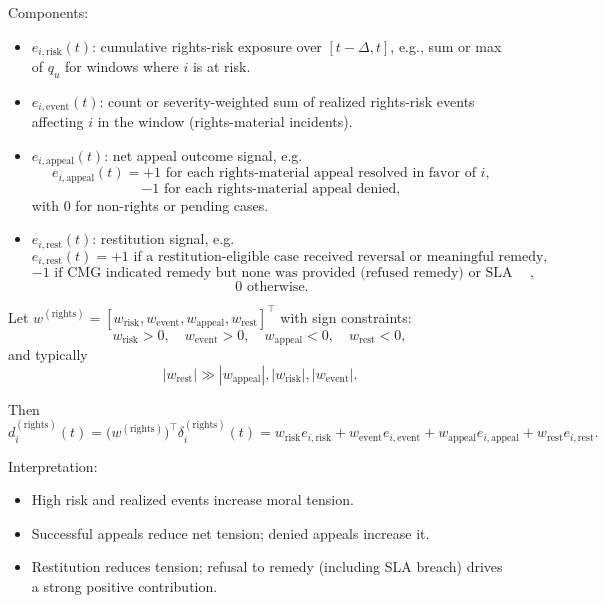 \documentclass[11pt]{article}
\begin{document}
Components:

\begin{itemize}[leftmargin=*]
  \item \(e_{i,\text{risk}}(t)\): cumulative rights-risk exposure over \([t-\Delta, t]\), e.g., sum or max of \(q_u\) for windows where \(i\) is at risk.

  \item \(e_{i,\text{event}}(t)\): count or severity-weighted sum of realized rights-risk events affecting \(i\) in the window (rights-material incidents).

  \item \(e_{i,\text{appeal}}(t)\): net appeal outcome signal, e.g.
  \[
  e_{i,\text{appeal}}(t) =
  +1 \text{ for each rights-material appeal resolved in favor of } i,
  \]
  \[
  -1 \text{ for each rights-material appeal denied},
  \]
  with 0 for non-rights or pending cases.

  \item \(e_{i,\text{rest}}(t)\): restitution signal, e.g.
  \[
  e_{i,\text{rest}}(t) =
  +1 \text{ if a restitution-eligible case received reversal or meaningful remedy},
  \]
  \[
  -1 \text{ if CMG indicated remedy but none was provided (refused remedy) or SLA was breached},
  \]
  \[
  0 \text{ otherwise}.
  \]
\end{itemize}

Let \(w^{(\text{rights})} = [w_{\text{risk}}, w_{\text{event}}, w_{\text{appeal}}, w_{\text{rest}}]^\top\) with sign constraints:
\[
w_{\text{risk}} > 0,\quad w_{\text{event}} > 0,\quad
w_{\text{appeal}} < 0,\quad w_{\text{rest}} < 0,
\]
and typically
\[
|w_{\text{rest}}| \gg |w_{\text{appeal}}|, |w_{\text{risk}}|, |w_{\text{event}}|.
\]

Then
\[
d_i^{(\text{rights})}(t) = \big(w^{(\text{rights})}\big)^\top \delta_i^{(\text{rights})}(t)
= w_{\text{risk}} e_{i,\text{risk}} + w_{\text{event}} e_{i,\text{event}} + w_{\text{appeal}} e_{i,\text{appeal}} + w_{\text{rest}} e_{i,\text{rest}}.
\]

Interpretation:

\begin{itemize}[leftmargin=*]
  \item High risk and realized events increase moral tension.
  \item Successful appeals reduce net tension; denied appeals increase it.
  \item Restitution reduces tension; refusal to remedy (including SLA breach) drives a strong positive contribution.
\end{itemize}
\end{document}
